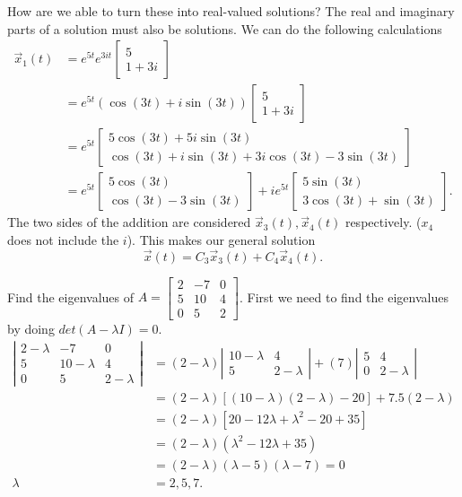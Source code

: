 How are we able to turn these into real-valued solutions? The real and imaginary parts of a solution must also be solutions. We can do the following calculations
\begin{align*}
  \vec{x}_1(t)&=e^{5t}e^{3it}\begin{bmatrix} 5\\1+3i \end{bmatrix} \\
              &=e^{5t}\left( \cos(3t)+i\sin(3t) \right)\begin{bmatrix} 5\\1+3i \end{bmatrix} \\
              &=e^{5t}\begin{bmatrix} 5\cos(3t)+5i\sin(3t)\\ \cos(3t)+i\sin(3t)+3i\cos(3t)-3\sin(3t) \end{bmatrix}\\
              &=e^{5t}\begin{bmatrix} 5\cos(3t)\\ \cos(3t)-3\sin(3t) \end{bmatrix} +ie^{5t}\begin{bmatrix} 5\sin(3t)\\3\cos(3t)+\sin(3t) \end{bmatrix} 
.\end{align*}
The two sides of the addition are considered $\vec{x}_3(t),\vec{x}_4(t)$ respectively. ($x_4$ does not include the $i$). This makes our general solution \[
  \vec{x}(t)=C_3\vec{x}_3(t)+C_4\vec{x}_4(t)
.\] 
\begin{eg}
  Find the eigenvalues of $A=\begin{bmatrix} 2&-7&0\\5&10&4\\0&5&2 \end{bmatrix} $. First we need to find the eigenvalues by doing $det(A-\lambda I)=0.$ 
  \begin{align*}
    \left| \begin{matrix} 2-\lambda&-7&0\\5&10-\lambda&4\\0&5&2-\lambda \end{matrix} \right| &= (2-\lambda)\left| \begin{matrix} 10-\lambda&4\\5&2-\lambda \end{matrix} \right| + (7) \left| \begin{matrix} 5&4\\0&2-\lambda \end{matrix} \right| \\
                                   &=(2-\lambda)[(10-\lambda)(2-\lambda)-20]+7.5(2-\lambda)\\
                                   &=(2-\lambda)[20-12\lambda+\lambda^2-20+35]\\
                                   &=(2-\lambda)(\lambda^2-12\lambda+35)\\
                                   &=(2-\lambda)(\lambda-5)(\lambda-7)=0\\
    \lambda&=2,5,7
  .\end{align*}
\end{eg}
